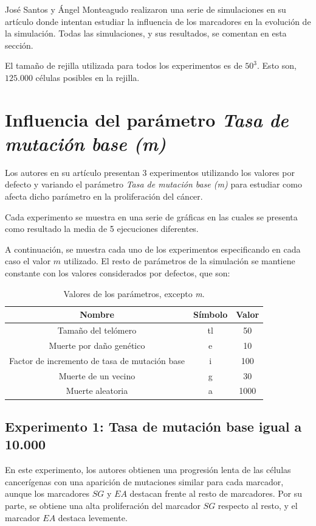 José Santos y Ángel Monteagudo realizaron una serie de simulaciones en su artículo
donde intentan estudiar la influencia de los marcadores en la evolución de la simulación.
Todas las simulaciones, y sus resultados, se comentan en esta sección.

El tamaño de rejilla utilizada para todos los experimentos es de $50^3$. Esto son,
$125.000$ células posibles en la rejilla.

\section{Influencia del parámetro \textit{Tasa de mutación base (m)}}

Los autores en su artículo presentan 3 experimentos utilizando los valores por defecto
y variando el parámetro \textit{Tasa de mutación base (m)} para estudiar como afecta
dicho parámetro en la proliferación del cáncer.

Cada experimento se muestra en una serie de gráficas en las cuales se presenta
como resultado la media de 5 ejecuciones diferentes.

A continuación, se muestra cada uno de los experimentos especificando en cada caso
el valor $m$ utilizado. El resto de parámetros de la simulación se mantiene constante
con los valores considerados por defectos, que son:

\begin{table}[h!]
  \centering
  \caption{Valores de los parámetros, excepto \textit{m}.}
  \label{tab:table1}
  \begin{tabular}{ccc}
    \toprule
    Nombre & Símbolo & Valor\\
    \midrule
    Tamaño del telómero & tl & 50\\
    Muerte por daño genético & e & 10\\
    Factor de incremento de tasa de mutación base & i & 100\\
    Muerte de un vecino & g & 30\\
    Muerte aleatoria & a & 1000\\
    \bottomrule
  \end{tabular}
\end{table}

\subsection{Experimento 1: Tasa de mutación base igual a 10.000}

En este experimento, los autores obtienen una progresión lenta de las células
cancerígenas con una aparición de mutaciones similar para cada marcador, aunque
los marcadores $SG$ y $EA$ destacan frente al resto de marcadores. Por su parte,
se obtiene una alta proliferación del marcador $SG$ respecto al resto, y el marcador
$EA$ destaca levemente.

